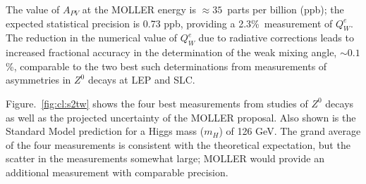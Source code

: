 The value of $A_{PV}$ at the MOLLER energy is 
$\approx 35$~parts per billion (ppb); the expected statistical precision is 0.73 ppb,
providing a 2.3\%\ measurement of $Q^e_W$. The reduction in the numerical value of $Q^e_W$ 
due to radiative corrections leads to increased fractional accuracy in the determination of the weak mixing
 angle, $\sim 0.1$\%, comparable to the two best such determinations from measurements of asymmetries in
$Z^0$ decays at LEP and SLC. 

Figure.~\ref{fig:cl:s2tw} shows
the four best measurements from studies of $Z^{0}$ decays~\cite{ref:cl:lepewwg}
as well as the projected uncertainty of the MOLLER proposal. Also shown
is the Standard Model prediction for a Higgs mass ($m_H$) of 126 GeV. The grand average of the
four measurements is consistent with the theoretical expectation, but the scatter in the measurements
somewhat large;  MOLLER would provide an additional measurement with comparable precision. 


